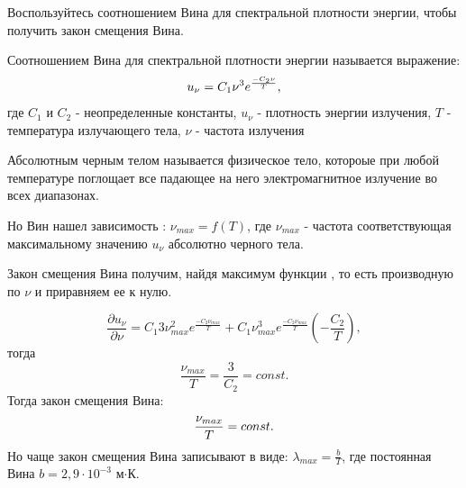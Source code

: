 \documentclass[__main__.tex]{subfiles}
\begin{document}
Воспользуйтесь соотношением Вина для спектральной плотности энергии, чтобы получить закон смещения Вина.\\ 

\begin{definition}
	Соотношением Вина для спектральной плотности энергии называется выражение: 
	\begin{gather}
	\llabel{29/1}
          u_{\nu}=C_{1}\nu^{3}e^{\frac{-C_{2}\nu}{T}},
	\end{gather}
где $C_{1}$ и $C_{2}$ - неопределенные константы, $u_{\nu}$ - плотность энергии излучения, $T$ - температура излучающего тела, $\nu$ - частота излучения
\end{definition}

\begin{definition}
	Абсолютным черным телом называется физическое тело, котороые при любой температуре поглощает все падающее на него электромагнитное излучение во всех диапазонах.
\end{definition}
Но Вин нашел зависимость : $\nu_{max} = f(T)$, где $\nu_{max}$ - частота соответствующая максимальному значению $u_{\nu}$ абсолютно черного тела.

Закон смещения Вина получим, найдя максимум функции , то есть производную по $\nu$ и приравняем ее к нулю.

$$
   \frac {\partial u_{\nu}}{\partial \nu}= C_{1}3\nu_{max}^{2}e^{\frac{-C_{2}\nu_{max}}{T}}+
   C_{1}\nu_{max}^{3}e^{\frac{-C_{2}\nu_{max}}{T}}(-\frac{C_{2}}{T}),
$$
тогда
$$
    \frac{\nu_{max}}{T}=\frac{3}{C_{2}}=const.
$$
Тогда закон смещения Вина:
\begin{gather}
\llabel{goof}
            \frac{\nu_{max}}{T}=const.
\end{gather}
Но чаще закон смещения Вина записывают в виде: $\lambda_{max}=\frac{b}{T}$, где постоянная Вина $b=2,9\cdot10^{-3}$ м$\cdot$К. 
\end{document}
